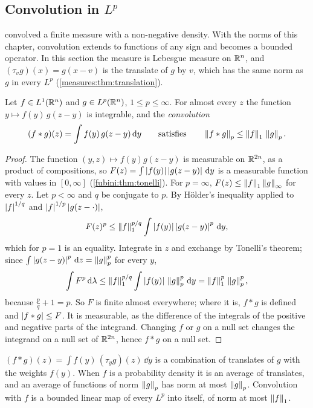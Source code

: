 \begin{notechapter}
\section{Convolution in $L^p$}\label{lp-spaces:sec:convolution}

 convolved a finite measure with a non-negative
density. With the norms of this chapter, convolution extends to
functions of any sign and becomes a bounded operator. In this section
the measure is Lebesgue measure on $\mathbb{R}^n$, and
$(\tau_vg)(x) = g(x - v)$ is the translate of $g$ by $v$, which has the
same norm as $g$ in every $L^p$ (\cref{measures:thm:translation}).

\begin{theorem}
\label{lp-spaces:thm:young}
Let $f\in L^1(\mathbb{R}^n)$ and $g\in L^p(\mathbb{R}^n)$, $1\leq p\leq\infty$. For
almost every $z$ the function $y\mapsto f(y)\,g(z - y)$ is integrable,
and the \emph{convolution}
\[
  (f*g)(z) = \int f(y)\,g(z - y)\,\mathrm{d} y
  \qquad\text{satisfies}\qquad
  \left\|f*g\right\|_p\leq\left\|f\right\|_1\,\left\|g\right\|_p .
\]
\end{theorem}

\begin{proof}
The function $(y, z)\mapsto f(y)g(z - y)$ is measurable on $\mathbb{R}^{2n}$, as
a product of compositions, so
$F(z) = \int\left|f(y)\right|\left|g(z - y)\right|\,\mathrm{d} y$ is a measurable function
with values in $[0, \infty]$ (\cref{fubini:thm:tonelli}). For
$p = \infty$, $F(z)\leq\left\|f\right\|_1\left\|g\right\|_\infty$ for every $z$. Let
$p < \infty$ and $q$ be conjugate to $p$. By H\"older's inequality
applied to $\left|f\right|^{1/q}$ and $\left|f\right|^{1/p}\left|g(z - \cdot)\right|$,
\[
  F(z)^p\leq\left\|f\right\|_1^{p/q}\int\left|f(y)\right|\left|g(z - y)\right|^p\,\mathrm{d} y ,
\]
which for $p = 1$ is an equality. Integrate in $z$ and exchange by
Tonelli's theorem; since $\int\left|g(z - y)\right|^p\,\mathrm{d} z = \left\|g\right\|_p^p$ for
every $y$,
\[
  \int F^p\,\mathrm{d}\lambda
  \leq\left\|f\right\|_1^{p/q}\int\left|f(y)\right|\,\left\|g\right\|_p^p\,\mathrm{d} y
  = \left\|f\right\|_1^p\,\left\|g\right\|_p^p ,
\]
because $\frac pq + 1 = p$. So $F$ is finite almost everywhere; where
it is, $f*g$ is defined and $\left|f*g\right|\leq F$. It is measurable, as the
difference of the integrals of the positive and negative parts of the
integrand. Changing $f$ or $g$ on a null set changes the integrand on a
null set of $\mathbb{R}^{2n}$, hence $f*g$ on a null set.
\end{proof}

\begin{intuition}
$(f*g)(z) = \int f(y)\,(\tau_yg)(z)\,\dd y$ is a combination of
translates of $g$ with the weights $f(y)$. When $f$ is a probability
density it is an average of translates, and an average of functions of
norm $\left\|g\right\|_p$ has norm at most $\left\|g\right\|_p$. Convolution with $f$ is
a bounded linear map of every $L^p$ into itself, of norm at most
$\left\|f\right\|_1$.
\end{intuition}


\end{notechapter}

